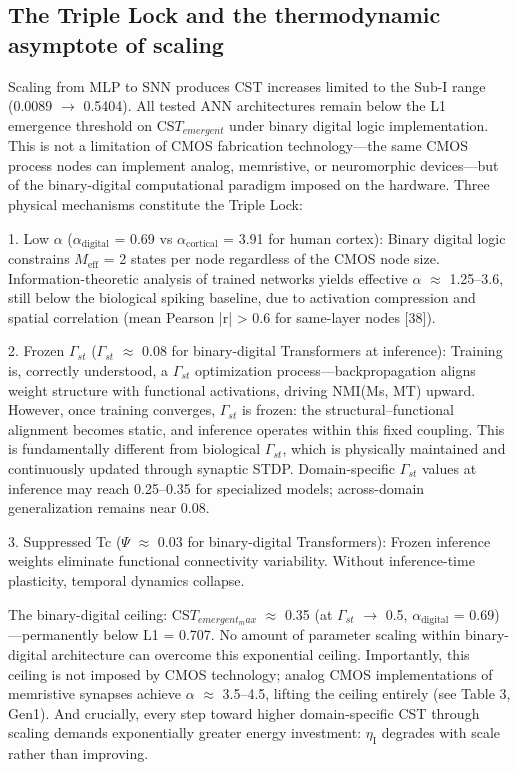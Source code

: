 \documentclass[a4paper,12pt]{article}
\begin{document}
\subsection{The Triple Lock and the thermodynamic asymptote of scaling}

Scaling from MLP to SNN produces CST increases limited to the Sub-I range (0.0089 $\rightarrow$ 0.5404).
All tested ANN architectures remain below the L1 emergence threshold on CS$T_{emergent}$ under binary digital logic implementation.
This is not a limitation of CMOS fabrication technology---the same CMOS process nodes can implement analog, memristive, or neuromorphic devices---but of the binary-digital computational paradigm imposed on the hardware.
Three physical mechanisms constitute the Triple Lock:


1. Low $\alpha$ ($\alpha_{\text{digital}}$ = 0.69 vs $\alpha_{\text{cortical}}$ = 3.91 for human cortex): Binary digital logic constrains $M_{\text{eff}}$ = 2 states per node regardless of the CMOS node size. Information-theoretic analysis of trained networks yields effective $\alpha$ $\approx$ 1.25--3.6, still below the biological spiking baseline, due to activation compression and spatial correlation (mean Pearson |r| > 0.6 for same-layer nodes [38]).


2.
Frozen $\Gamma_{st}$ ($\Gamma_{st}$ $\approx$ 0.08 for binary-digital Transformers at inference): Training is, correctly understood, a $\Gamma_{st}$ optimization process---backpropagation aligns weight structure with functional activations, driving NMI(Ms, MT) upward.
However, once training converges, $\Gamma_{st}$ is frozen: the structural--functional alignment becomes static, and inference operates within this fixed coupling.
This is fundamentally different from biological $\Gamma_{st}$, which is physically maintained and continuously updated through synaptic STDP.
Domain-specific $\Gamma_{st}$ values at inference may reach 0.25--0.35 for specialized models; across-domain generalization remains near 0.08.


3. Suppressed Tc ($\Psi$ $\approx$ 0.03 for binary-digital Transformers): Frozen inference weights eliminate functional connectivity variability. Without inference-time plasticity, temporal dynamics collapse.


The binary-digital ceiling: CS$T_{emergent_max}$ $\approx$ 0.35 (at $\Gamma_{st}$ $\rightarrow$ 0.5, $\alpha_{\text{digital}}$ = 0.69)---permanently below L1 = 0.707.
No amount of parameter scaling within binary-digital architecture can overcome this exponential ceiling.
Importantly, this ceiling is not imposed by CMOS technology; analog CMOS implementations of memristive synapses achieve $\alpha$ $\approx$ 3.5--4.5, lifting the ceiling entirely (see Table 3, Gen1).
And crucially, every step toward higher domain-specific CST through scaling demands exponentially greater energy investment: $\eta_{\text{I}}$ degrades with scale rather than improving.
\end{document}
